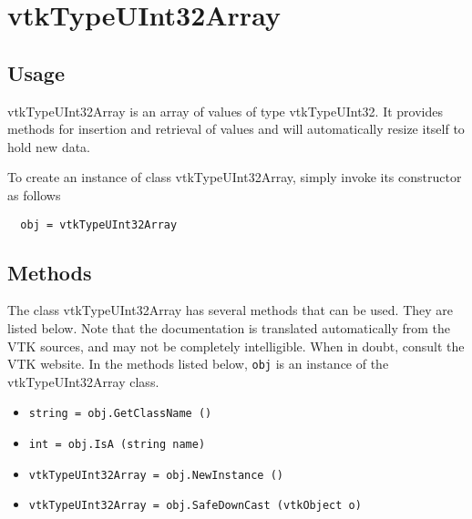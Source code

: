\section{vtkTypeUInt32Array}

\subsection{Usage}

 vtkTypeUInt32Array is an array of values of type vtkTypeUInt32.  It
 provides methods for insertion and retrieval of values and will
 automatically resize itself to hold new data.

To create an instance of class vtkTypeUInt32Array, simply
invoke its constructor as follows
\begin{verbatim}
  obj = vtkTypeUInt32Array
\end{verbatim}
\subsection{Methods}

The class vtkTypeUInt32Array has several methods that can be used.
  They are listed below.
Note that the documentation is translated automatically from the VTK sources,
and may not be completely intelligible.  When in doubt, consult the VTK website.
In the methods listed below, \verb|obj| is an instance of the vtkTypeUInt32Array class.
\begin{itemize}
\item  \verb|string = obj.GetClassName ()|

\item  \verb|int = obj.IsA (string name)|

\item  \verb|vtkTypeUInt32Array = obj.NewInstance ()|

\item  \verb|vtkTypeUInt32Array = obj.SafeDownCast (vtkObject o)|

\end{itemize}
